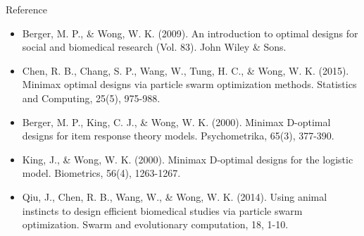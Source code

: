 \documentclass{beamer}
\begin{document}
\begin{frame}{Reference}
  \begin{itemize}
    \item Berger, M. P., \& Wong, W. K. (2009). An introduction to optimal designs for social and biomedical research (Vol. 83). John Wiley \& Sons.
    \item Chen, R. B., Chang, S. P., Wang, W., Tung, H. C., \& Wong, W. K. (2015). Minimax optimal designs via particle swarm optimization methods. Statistics and Computing, 25(5), 975-988.
    \item Berger, M. P., King, C. J., \& Wong, W. K. (2000). Minimax D-optimal designs for item response theory models. Psychometrika, 65(3), 377-390.
    \item King, J., \& Wong, W. K. (2000). Minimax D‐optimal designs for the logistic model. Biometrics, 56(4), 1263-1267.
    \item Qiu, J., Chen, R. B., Wang, W., \& Wong, W. K. (2014). Using animal instincts to design efficient biomedical studies via particle swarm optimization. Swarm and evolutionary computation, 18, 1-10.
  \end{itemize}
\end{frame}





%
%  
\end{document}
